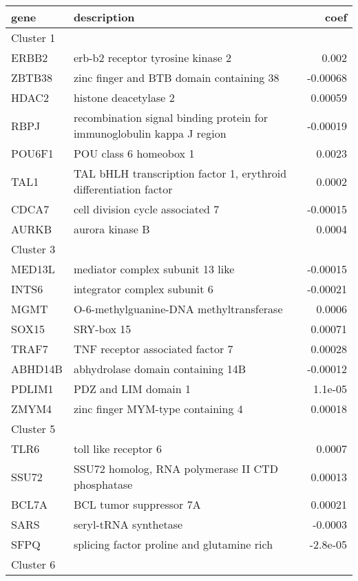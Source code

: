 \documentclass{article}
\begin{document}
\begin{table*}[ht!]
\centering
\begin{small}
\begin{tabular}{llr}
  \toprule
gene & description & coef \\ 
  \midrule
  Cluster 1 \\
  \midrule
ERBB2 & erb-b2 receptor tyrosine kinase 2 & 0.002 \\ 
  ZBTB38 & zinc finger and BTB domain containing 38 & -0.00068 \\ 
  HDAC2 & histone deacetylase 2 & 0.00059 \\ 
  RBPJ & recombination signal binding protein for immunoglobulin kappa J region & -0.00019 \\ 
  POU6F1 & POU class 6 homeobox 1 & 0.0023 \\ 
  TAL1 & TAL bHLH transcription factor 1, erythroid differentiation factor & 0.0002 \\ 
  CDCA7 & cell division cycle associated 7 & -0.00015 \\ 
  AURKB & aurora kinase B & 0.0004 \\ 
   \midrule
   Cluster 3 \\
   \midrule
   MED13L & mediator complex subunit 13 like & -0.00015 \\ 
  INTS6 & integrator complex subunit 6 & -0.00021 \\ 
  MGMT & O-6-methylguanine-DNA methyltransferase & 0.0006 \\ 
  SOX15 & SRY-box 15 & 0.00071 \\ 
  TRAF7 & TNF receptor associated factor 7 & 0.00028 \\ 
  ABHD14B & abhydrolase domain containing 14B & -0.00012 \\ 
  PDLIM1 & PDZ and LIM domain 1 & 1.1e-05 \\ 
  ZMYM4 & zinc finger MYM-type containing 4 & 0.00018 \\ 
   \midrule
   Cluster 5 \\
   \midrule
   TLR6 & toll like receptor 6 & 0.0007 \\ 
  SSU72 & SSU72 homolog, RNA polymerase II CTD phosphatase & 0.00013 \\ 
  BCL7A & BCL tumor suppressor 7A & 0.00021 \\ 
  SARS & seryl-tRNA synthetase & -0.0003 \\ 
  SFPQ & splicing factor proline and glutamine rich & -2.8e-05 \\ 
  \midrule
  Cluster 6 \\

\end{tabular}
\end{small}
\end{table*}
\end{document}
